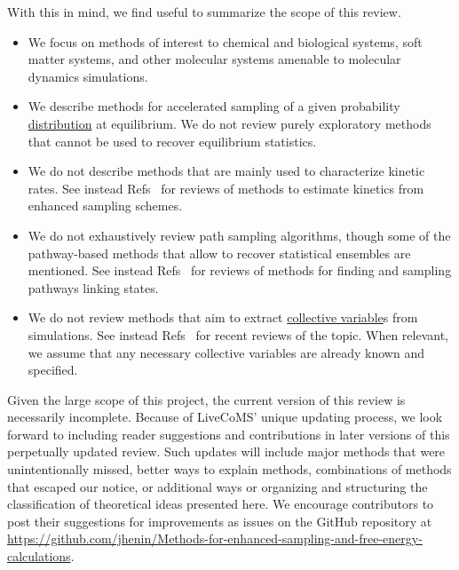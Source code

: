 \documentclass[9pt,review]{livecoms}
\begin{document}
With this in mind, we find useful to summarize the scope of this review.

\begin{itemize}
    \item We focus on methods of interest to chemical and biological systems, soft matter systems, and other molecular systems amenable to molecular dynamics simulations.
    \item We describe methods for accelerated sampling of a given probability \hyperlink{ref:Distribution} {distribution} at equilibrium.
    We do not review purely exploratory methods that cannot be used to recover equilibrium statistics.
    \item We do not describe methods that are mainly used to characterize kinetic rates. See instead Refs~\cite{BRUCE20181,doi:10.1146/annurev-physchem-042018-052340,Dickson:2017:1568-0266:2626,10.1021/acs.biochem.8b00977,https://doi.org/10.1002/wcms.1455,Kieninger2020} for reviews of methods to estimate kinetics from enhanced sampling schemes.
    \item We do not exhaustively review path sampling algorithms, though some of the pathway-based methods that allow to recover statistical ensembles are mentioned. See instead Refs~\cite{DellagoBolhuis,CHONG201788,Peters2017,Elber2020}
    for reviews of methods for finding and sampling pathways linking states.
    \item We do not review methods that aim to extract \hyperlink{ref:CV} {collective variable}s from simulations. See instead Refs~\cite{WANG2020139,doi:10.1080/00268976.2020.1737742,doi:10.1021/acs.jctc.0c00355} for recent reviews of the topic. When relevant, we assume that any necessary collective variables are already known and specified.
\end{itemize}

Given the large scope of this project, the current version of this review is necessarily incomplete. Because of LiveCoMS' unique updating process, we look forward to including reader suggestions and contributions in later versions of this perpetually updated review. Such updates will include major methods that were unintentionally missed, better ways to explain methods, combinations of methods that escaped our notice, or additional ways or organizing and structuring the classification of theoretical ideas presented here. We encourage contributors to post their suggestions for improvements as issues on the GitHub repository at \url{https://github.com/jhenin/Methods-for-enhanced-sampling-and-free-energy-calculations}.
\end{document}

